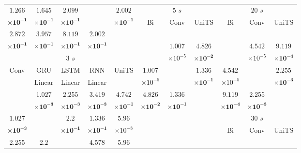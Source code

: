 \begin{table}[!ht]
{\begin{tabular}{|c|c|c|c|c|c|c|c|c|c|c|}
			$\mathbf{1.266}$ & $\mathbf{1.645}$ & $\mathbf{2.099}$ & \multirow{2}{*}{} & $\mathbf{2.002}$ & \multicolumn{3}{c}{$5$ $s$} & \multicolumn{3}{c}{$20$ $s$} \\ \cline{6-11}
			$\mathbf{\times 10^{-1}}$ & $\mathbf{\times 10^{-1}}$ & $\mathbf{\times 10^{-1}}$ & & $\mathbf{\times 10^{-1}}$ & \multirow{2}{*}{Bi} & \multirow{2}{*}{Conv} & \multirow{2}{*}{UniTS} & \multirow{2}{*}{Bi} & \multirow{2}{*}{Conv} & \multirow{2}{*}{UniTS} \\ \cline{1-5}
			$\mathbf{2.872}$ & $\mathbf{3.957}$ & $\mathbf{8.119}$ & $\mathbf{2.002}$ & \multirow{2}{*}{} & & & & & & \\ \cline{6-11}
			$\mathbf{\times 10^{-1}}$ & $\mathbf{\times 10^{-1}}$ & $\mathbf{\times 10^{-1}}$ & $\mathbf{\times 10^{-1}}$ & & \multirow{2}{*}{} & $1.007$ & $\mathbf{4.826}$ & \multirow{2}{*}{} & $4.542$ & $\mathbf{9.119}$\\ \cline{1-5}
			\multicolumn{5}{c}{$3$ $s$} & & $\times 10^{-5}$ & $\mathbf{\times 10^{-2}}$ & & $\times 10^{-5}$ & $\mathbf{\times 10^{-4}}$\\ \cline{1-11}
			\multirow{2}{*}{Conv} & GRU & LSTM & RNN & \multirow{2}{*}{UniTS} & $1.007$ & \multirow{2}{*}{} & $\mathbf{1.336}$ & $4.542$ & \multirow{2}{*}{} & $\mathbf{2.255}$\\ 
			 & Linear & Linear & Linear & & $\times 10^{-5}$ & & $\mathbf{\times 10^{-1}}$ & $\times 10^{-5}$ & & $\mathbf{\times 10^{-3}}$\\ \cline{1-11}
			\multirow{2}{*}{} & $\mathbf{1.027}$ & $\mathbf{2.255}$ & $\mathbf{3.419}$ & $\mathbf{4.742}$ & $\mathbf{4.826}$ & $\mathbf{1.336}$ & \multirow{2}{*}{} & $\mathbf{9.119}$ & $\mathbf{2.255}$ & \multirow{2}{*}{} \\ 
			 & $\mathbf{\times 10^{-3}}$ & $\mathbf{\times 10^{-3}}$ & $\mathbf{\times 10^{-3}}$ & $\mathbf{\times 10^{-1}}$ & $\mathbf{\times 10^{-2}}$ & $\mathbf{\times 10^{-1}}$ & & $\mathbf{\times 10^{-4}}$ & $\mathbf{\times 10^{-3}}$ & \\ \cline{1-11}
			$\mathbf{1.027}$ & \multirow{2}{*}{} & $\mathbf{2.2}$ & $\mathbf{1.336}$ & $5.96$ & \multicolumn{3}{c}{} & \multicolumn{3}{c}{$30$ $s$} \\ \cline{9-11}
			$\mathbf{\times 10^{-3}}$ & & $\mathbf{\times 10^{-1}}$ & $\mathbf{\times 10^{-1}}$ & $\times 10^{-8}$ & \multicolumn{3}{c}{} & \multirow{2}{*}{Bi} & \multirow{2}{*}{Conv} & \multirow{2}{*}{UniTS} \\ \cline{1-5}
			$\mathbf{2.255}$ & $\mathbf{2.2}$ & \multirow{2}{*}{} & $\mathbf{4.578}$ & $5.96$ & \multicolumn{3}{c}{} & & & \\ \cline{9-11}

\end{tabular}}
\end{table}
